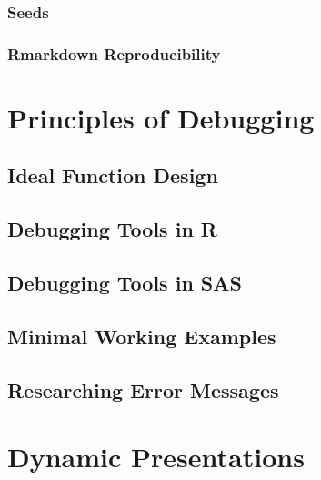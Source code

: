 \documentclass[]{book}
\begin{document}
\hypertarget{seeds}{%
\subsection{Seeds}\label{seeds}}

\hypertarget{rmarkdown-reproducibility}{%
\subsection{Rmarkdown Reproducibility}\label{rmarkdown-reproducibility}}

\hypertarget{debugging}{%
\chapter{Principles of Debugging}\label{debugging}}

\hypertarget{ideal-function-design}{%
\section{Ideal Function Design}\label{ideal-function-design}}

\hypertarget{debugging-tools-in-r}{%
\section{Debugging Tools in R}\label{debugging-tools-in-r}}

\hypertarget{debugging-tools-in-sas}{%
\section{Debugging Tools in SAS}\label{debugging-tools-in-sas}}

\hypertarget{minimal-working-examples}{%
\section{Minimal Working Examples}\label{minimal-working-examples}}

\hypertarget{researching-error-messages}{%
\section{Researching Error Messages}\label{researching-error-messages}}

\hypertarget{presentations}{%
\chapter{Dynamic Presentations}\label{presentations}}
\end{document}
